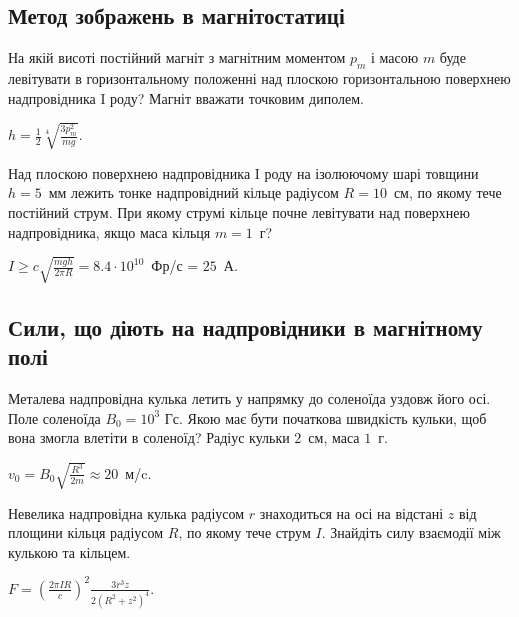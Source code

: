 \subsection*{Метод зображень в магнітостатиці}
\begin{problem}
На якій висоті постійний магніт з магнітним моментом $p_m$ і масою $m$ буде левітувати в горизонтальному положенні над плоскою горизонтальною поверхнею надпровідника I роду? Магніт вважати точковим диполем.
\begin{solution}
	$h = \frac12 \sqrt[4]{\frac{3p_m^2}{mg}}$.
\end{solution}
\end{problem}

\begin{problem}
Над плоскою поверхнею надпровідника I роду на ізолюючому шарі товщини $h = 5$~мм лежить тонке надпровідний кільце радіусом $R = 10$~см, по якому тече постійний струм. При якому струмі кільце почне левітувати над поверхнею надпровідника, якщо маса кільця $m = 1$~г?
\begin{solution}
	$I \ge c \sqrt{\frac{mgh}{2\pi R}} = 8.4\cdot 10^{10}$~Фр/с = $25$~А.
\end{solution}
\end{problem}

\subsection*{Сили, що діють на надпровідники в магнітному полі}

\begin{problem} %
Металева надпровідна кулька летить у напрямку до соленоїда уздовж його осі. Поле соленоїда $B_0 = 10^3$ Гс. Якою має бути початкова швидкість кульки, щоб вона змогла влетіти в соленоїд? Радіус кульки $2$~см, маса $1$~г.
\begin{solution}
	$v_0 = B_0 \sqrt{\frac{R^3}{2m}} \approx 20$~м/c.
\end{solution}
\end{problem}

\begin{problem}
Невелика надпровідна кулька радіусом $r$ знаходиться на осі на відстані $z$ від площини кільця радіусом $R$, по якому тече струм $I$. Знайдіть силу взаємодії між кулькою та кільцем.
\begin{solution}
	$F = \left( \frac{2\pi I R}{c} \right)^2 \frac{3r^3 z}{2(R^2 + z^2)^4} $.
\end{solution}
\end{problem}


